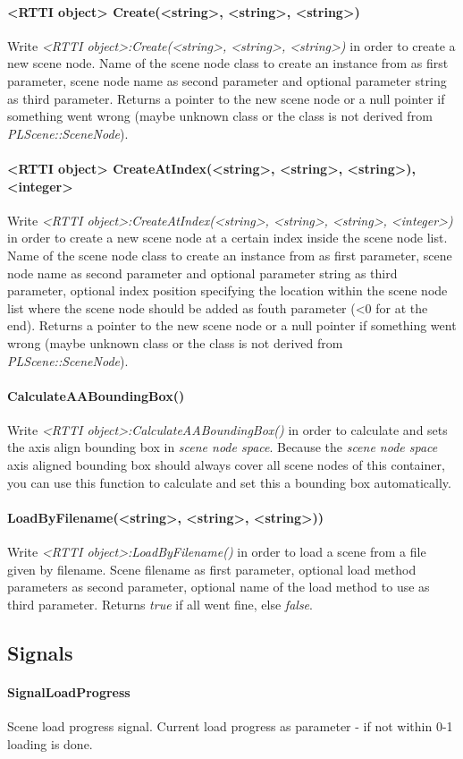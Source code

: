 \paragraph{<RTTI object> Create(<string>, <string>, <string>)}
Write \emph{<RTTI object>:Create(<string>, <string>, <string>)} in order to create a new scene node. Name of the scene node class to create an instance from as first parameter, scene node name as second parameter and optional parameter string as third parameter. Returns a pointer to the new scene node or a null pointer if something went wrong (maybe unknown class or the class is not derived from \emph{PLScene::SceneNode}).

\paragraph{<RTTI object> CreateAtIndex(<string>, <string>, <string>), <integer>}
Write \emph{<RTTI object>:CreateAtIndex(<string>, <string>, <string>, <integer>)} in order to create a new scene node at a certain index inside the scene node list. Name of the scene node class to create an instance from as first parameter, scene node name as second parameter and optional parameter string as third parameter, optional index position specifying the location within the scene node list where the scene node should be added as fouth parameter (<0 for at the end). Returns a pointer to the new scene node or a null pointer if something went wrong (maybe unknown class or the class is not derived from \emph{PLScene::SceneNode}).

\paragraph{CalculateAABoundingBox()}
Write \emph{<RTTI object>:CalculateAABoundingBox()} in order to calculate and sets the axis align bounding box in \emph{scene node space}. Because the \emph{scene node space} axis aligned bounding box should always cover all scene nodes of this container, you can use this function to calculate and set this a bounding box automatically.

\paragraph{LoadByFilename(<string>, <string>, <string>))}
Write \emph{<RTTI object>:LoadByFilename()} in order to load a scene from a file given by filename. Scene filename as first parameter, optional load method parameters as second parameter, optional name of the load method to use as third parameter. Returns \emph{true} if all went fine, else \emph{false}.


\subsection{Signals}

\paragraph{SignalLoadProgress}
Scene load progress signal. Current load progress as parameter - if not within 0-1 loading is done.
